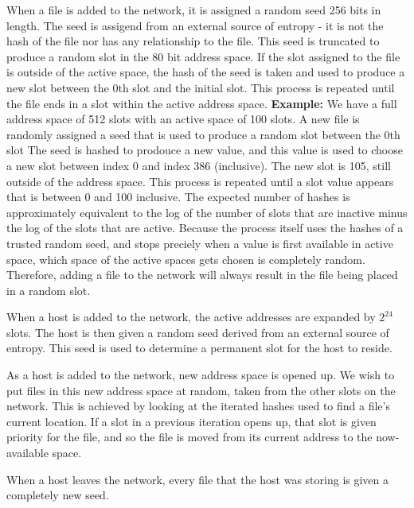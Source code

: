 \documentclass[twocolumn]{article}
\begin{document}
When a file is added to the network, it is assigned a random seed 256 bits in length.
The seed is assigend from an external source of entropy - it is not the hash of the file nor has any relationship to the file.
This seed is truncated to produce a random slot in the 80 bit address space.
If the slot assigned to the file is outside of the active space, the hash of the seed is taken and used to produce a new slot between the 0th slot and the initial slot.
This process is repeated until the file ends in a slot within the active address space.
\textbf{Example:} We have a full address space of 512 slots with an active space of 100 slots.
A new file is randomly assigned a seed that is used to produce a random slot between the 0th slot
The seed is hashed to prodouce a new value, and this value is used to choose a new slot between index 0 and index 386 (inclusive).
The new slot is 105, still outside of the address space.
This process is repeated until a slot value appears that is between 0 and 100 inclusive.
The expected number of hashes is approximately equivalent to the log of the number of slots that are inactive minus the log of the slots that are active.
Because the process itself uses the hashes of a trusted random seed, and stops preciely when a value is first available in active space, which space of the active spaces gets chosen is completely random.
Therefore, adding a file to the network will always result in the file being placed in a random slot.

When a host is added to the network, the active addresses are expanded by $2^{24}$ slots.
The host is then given a random seed derived from an external source of entropy.
This seed is used to determine a permanent slot for the host to reside.

As a host is added to the network, new address space is opened up.
We wish to put files in this new address space at random, taken from the other slots on the network.
This is achieved by looking at the iterated hashes used to find a file's current location.
If a slot in a previous iteration opens up, that slot is given priority for the file, and so the file is moved from its current address to the now-available space.

When a host leaves the network, every file that the host was storing is given a completely new seed.
\end{document}
